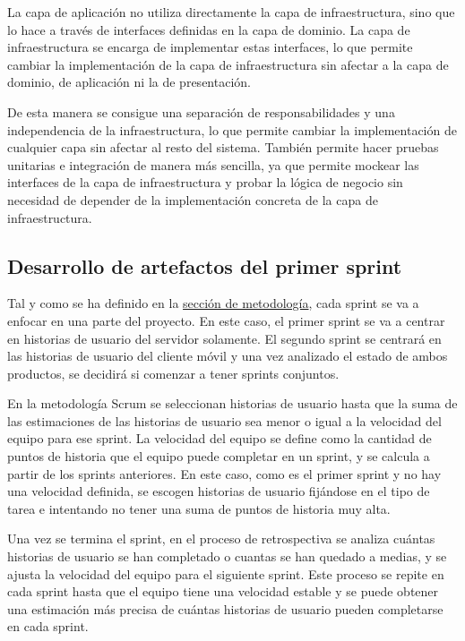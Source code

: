 La capa de aplicación no utiliza directamente la capa de infraestructura, sino que lo hace a través de interfaces definidas en la capa de dominio. La capa de infraestructura se encarga de implementar estas interfaces, lo que permite cambiar la implementación de la capa de infraestructura sin afectar a la capa de dominio, de aplicación ni la de presentación.

De esta manera se consigue una separación de responsabilidades y una independencia de la infraestructura, lo que permite cambiar la implementación de cualquier capa sin afectar al resto del sistema.
También permite hacer pruebas unitarias e integración de manera más sencilla, ya que permite \gls{mockear} las interfaces de la capa de infraestructura y probar la lógica de negocio sin necesidad de depender de la implementación concreta de la capa de infraestructura.

\subsection{Desarrollo de artefactos del primer sprint}
Tal y como se ha definido en la \hyperref[sec:metodologia]{sección de metodología}, cada sprint se va a enfocar en una parte del proyecto. En este caso, el primer sprint se va a centrar en historias de usuario del servidor solamente. El segundo sprint se centrará en las historias de usuario del cliente móvil y una vez analizado el estado de ambos productos, se decidirá si comenzar a tener sprints conjuntos.

En la metodología Scrum se seleccionan historias de usuario hasta que la suma de las estimaciones de las historias de usuario sea menor o igual a la velocidad del equipo para ese sprint.
La velocidad del equipo se define como la cantidad de puntos de historia que el equipo puede completar en un sprint, y se calcula a partir de los sprints anteriores.
En este caso, como es el primer sprint y no hay una velocidad definida, se escogen historias de usuario fijándose en el tipo de tarea e intentando no tener una suma de puntos de historia muy alta.

Una vez se termina el sprint, en el proceso de retrospectiva se analiza cuántas historias de usuario se han completado o cuantas se han quedado a medias, y se ajusta la velocidad del equipo para el siguiente sprint. Este proceso se repite en cada sprint hasta que el equipo tiene una velocidad estable y se puede obtener una estimación más precisa de cuántas historias de usuario pueden completarse en cada sprint.

